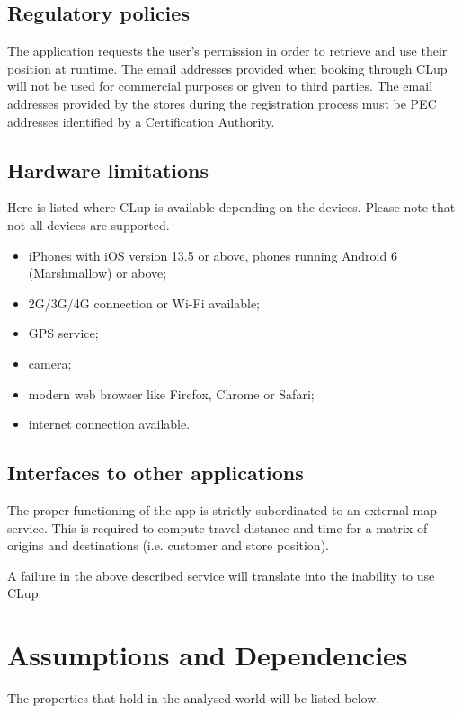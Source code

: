 \subsection{Regulatory policies}
The application requests the user's permission in order to retrieve and use their position at runtime.\newline
The email addresses provided when booking through CLup will not be used for commercial purposes or given to third parties.\newline
The email addresses provided by the stores during the registration process must be PEC addresses identified by a Certification Authority.

\subsection{Hardware limitations}
Here is listed where CLup is available depending on the devices. Please note that not all devices are supported.

\begin{itemize}
	\item iPhones with iOS version 13.5 or above, phones running Android 6 (Marshmallow) or above;
	\item 2G/3G/4G connection or Wi-Fi available;
	\item GPS service;
	\item camera;
	\item modern web browser like Firefox, Chrome or Safari;
	\item internet connection available.
\end{itemize}


\subsection{Interfaces to other applications}
The proper functioning of the app is strictly subordinated to an external map service. This is required to compute travel distance and time for a matrix of origins and destinations (i.e. customer and store position).

A failure in the above described service will translate into the inability to use CLup.

\clearpage

\section{Assumptions and Dependencies}
The properties that hold in the analysed world will be listed below.
